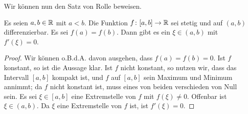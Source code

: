 \documentclass[a4paper,10pt]{article}
\begin{document}
Wir können nun den Satz von Rolle beweisen.


\begin{thrm}[Rolle]
 Es seien $a,b \in \mathbb{R}$ mit $a < b$. Die Funktion $f \colon [a,b] \to \mathbb{R}$ sei stetig und auf $(a,b)$ differenzierbar. Es sei $f(a) = f(b)$. Dann gibt es ein $\xi \in (a,b)$ mit $f'(\xi) = 0$. 
\end{thrm}
\begin{proof}
 Wir können o.B.d.A. davon ausgehen, dass $f(a) = f(b) = 0$. Ist $f$ konstant, so ist die Aussage klar. Ist $f$ nicht konstant, so nutzen wir, dass das Intervall $[a,b]$ kompakt ist, und $f$ auf $[a,b]$ sein Maximum und Minimum annimmt; da $f$ nicht konstant ist, muss eines von beiden verschieden von Null sein. Es sei $\xi \in [a,b]$ eine Extremstelle von $f$ mit $f(\xi) \neq 0$. Offenbar ist $\xi \in (a,b)$. Da $\xi$ eine Extremstelle von $f$ ist, ist $f'(\xi) = 0$.
\end{proof}
\end{document}
